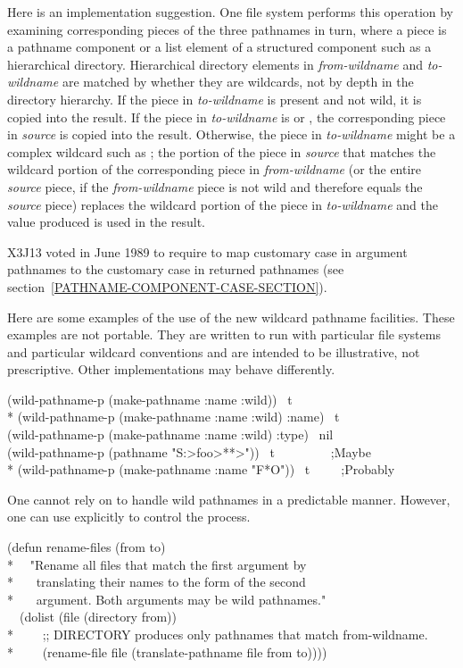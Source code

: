 \begin{newer}
\begin{defun}[Function]
    Here is an implementation suggestion.   One file system performs this operation by
    examining corresponding pieces of the three pathnames in turn, where a piece is a
    pathname component or a list element of a structured component such as
    a hierarchical directory.  Hierarchical directory elements in
    {\it from-wildname} and {\it to-wildname} are matched by whether they are
    wildcards, not by depth in the directory hierarchy.  If the piece in
    {\it to-wildname} is present and not wild, it is copied into the result.
    If the piece in {\it to-wildname} is  or , the corresponding
    piece in {\it source} is
    copied into the result.  Otherwise, the piece in {\it to-wildname} might be
    a complex wildcard such as ; the portion of the piece in {\it source}
    that matches the
    wildcard portion of the corresponding piece in {\it from-wildname} (or the entire
    {\it source} piece, if the {\it from-wildname} piece is not wild and therefore
    equals the {\it source} piece) replaces the wildcard
    portion of the piece in {\it to-wildname} and the value produced is used in
    the result.

X3J13 voted in June 1989  to
require  to map customary case in argument
pathnames to the customary case in returned pathnames
(see section~\ref{PATHNAME-COMPONENT-CASE-SECTION}).

Here are some examples of the use of the new wildcard pathname facilities.
These examples are not portable.  They are written to run
with particular file systems and particular wildcard conventions and are
intended to be illustrative, not prescriptive.
Other implementations may behave differently.
\begin{lisp}
(wild-pathname-p (make-pathname :name :wild)) \EV\ t \\*
(wild-pathname-p (make-pathname :name :wild) :name) \EV\ t \\
(wild-pathname-p (make-pathname :name :wild) :type) \EV\ nil \\
(wild-pathname-p (pathname "S:>foo>**>")) \EV\ t~~~~~~~~~;{\rm Maybe} \\*
(wild-pathname-p (make-pathname :name "F*O")) \EV\ t~~~~~;{\rm Probably}
\end{lisp}
One cannot rely on  to handle wild pathnames in a predictable
manner.  However, one can use  explicitly to control
the process.
\begin{lisp}
(defun rename-files (from to) \\*
~~"Rename all files that match the first argument by \\*
~~~translating their names to the form of the second \\*
~~~argument.  Both arguments may be wild pathnames." \\
~~(dolist (file (directory from)) \\*
~~~~;; DIRECTORY produces only pathnames that match from-wildname. \\*
~~~~(rename-file file (translate-pathname file from to))))
\end{lisp}
\end{defun}


\end{newer}
